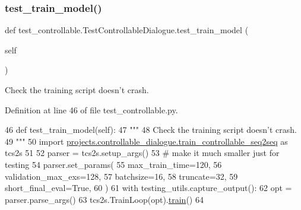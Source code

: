 \subsubsection{\texorpdfstring{test\+\_\+train\+\_\+model()}{test\_train\_model()}}
{\footnotesize\ttfamily def test\+\_\+controllable.\+Test\+Controllable\+Dialogue.\+test\+\_\+train\+\_\+model (\begin{DoxyParamCaption}\item[{}]{self }\end{DoxyParamCaption})}

\begin{DoxyVerb}Check the training script doesn't crash.
\end{DoxyVerb}
 

Definition at line 46 of file test\+\_\+controllable.\+py.


\begin{DoxyCode}
46     \textcolor{keyword}{def }test\_train\_model(self):
47         \textcolor{stringliteral}{"""}
48 \textcolor{stringliteral}{        Check the training script doesn't crash.}
49 \textcolor{stringliteral}{        """}
50         \textcolor{keyword}{import} \hyperlink{namespaceprojects_1_1controllable__dialogue_1_1train__controllable__seq2seq}{projects.controllable\_dialogue.train\_controllable\_seq2seq}
       \textcolor{keyword}{as} tcs2s
51 
52         parser = tcs2s.setup\_args()
53         \textcolor{comment}{# make it much smaller just for testing}
54         parser.set\_params(
55             max\_train\_time=120,
56             validation\_max\_exs=128,
57             batchsize=16,
58             truncate=32,
59             short\_final\_eval=\textcolor{keyword}{True},
60         )
61         with testing\_utils.capture\_output():
62             opt = parser.parse\_args()
63             tcs2s.TrainLoop(opt).\hyperlink{namespaceprojects_1_1mastering__the__dungeon_1_1mturk_1_1tasks_1_1MTD_1_1run_a36a5f4f6f9df0611a6818610518d2cf0}{train}()
64 
\end{DoxyCode}
\mbox{\label{classtest__controllable_1_1TestControllableDialogue_acc29f953a7fb51ef9a0dedafa8129cc2}} 
